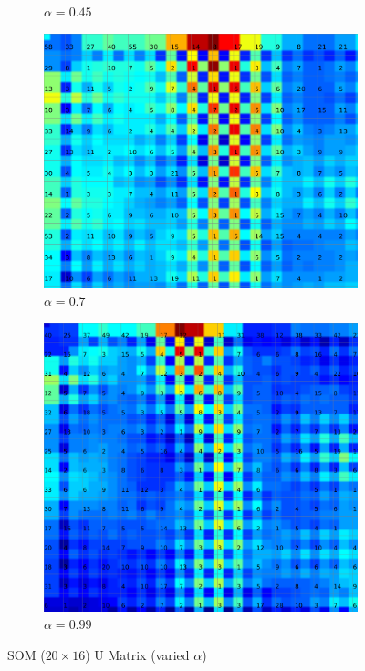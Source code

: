 \documentclass{acm_proc_article-sp}
\begin{document}
\begin{figure}
\begin{subfigure}[b]{0.24\linewidth}
        \caption{$\alpha=0.45$}
        \label{fig:wine-20x16-u-matrix-alpha-0,45}
    \end{subfigure}
    \begin{subfigure}[b]{0.24\linewidth}
        \includegraphics[width=\linewidth]{img/wine-20x16-u-matrix-alpha-0,7}
        \caption{$\alpha=0.7$}
        \label{fig:wine-20x16-u-matrix-alpha-0,7}
    \end{subfigure}
    \begin{subfigure}[b]{0.24\linewidth}
        \includegraphics[width=\linewidth]{img/wine-20x16-u-matrix-alpha-0,99}
        \caption{$\alpha=0.99$}
        \label{fig:wine-20x16-u-matrix-alpha-0,99}
    \end{subfigure}
    \caption{SOM ($20\times16$) U Matrix (varied $\alpha$)}
    \label{fig:wine-20x16-u-matrix-alpha}
\end{figure}
\end{document}
